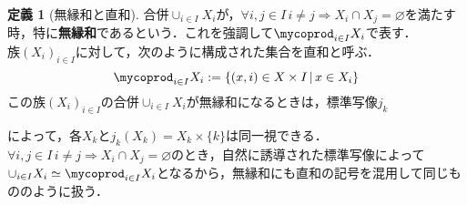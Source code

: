 \documentclass[uplatex, 12pt, dvipdfmx]{jsreport}
\theoremstyle{definition}
\newtheorem{definition}[theorem]{定義}
\theoremstyle{StatementsWithStar}
\theoremstyle{StatementsWithStar2}
\theoremstyle{StatementsWithStar3}
\theoremstyle{StatementsWithCCirc}
\theoremstyle{definition}
\let\coprod\mycoprod
\begin{document}
        \clearpage
        \begin{definition}[無縁和と直和]
            合併$\cup_{i\in I}X_i$が，$\forall i,j\in I \, i\ne j\Rightarrow X_i\cap X_j=\varnothing$を満たす時，特に\textbf{無縁和}であるという．これを強調して$\coprod_{i\in I}X_i$で表す．\\
            族$(X_i)_{i\in I}$に対して，次のように構成された集合を直和と呼ぶ．
            $$\coprod_{i\in I}X_i := \{ (x,i)\in X\times I\, |\, x\in X_i \}$$
            この族$(X_i)_{i\in I}$の合併$\cup_{i\in I}X_i$が無縁和になるときは，標準写像$j_k$
            \begin{center}\end{center}
            によって，各$X_k$と$j_k(X_k)=X_k\times \{k\}$は同一視できる．$\forall i,j\in I\, i\ne j\Rightarrow X_i\cap X_j=\varnothing$のとき，自然に誘導された標準写像によって$\cup_{i\in I}X_i\simeq \coprod_{i\in I}X_i$となるから，無縁和にも直和の記号を混用して同じもののように扱う．
        \end{definition}
\end{document}
